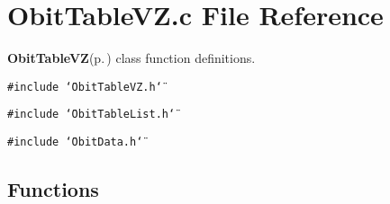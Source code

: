 \section{Obit\-Table\-VZ.c File Reference}
\label{ObitTableVZ_8c}
{\bf Obit\-Table\-VZ}{\rm (p.\,\pageref{structObitTableVZ})} class function definitions. 

{\tt \#include \char`\"{}Obit\-Table\-VZ.h\char`\"{}}\par
{\tt \#include \char`\"{}Obit\-Table\-List.h\char`\"{}}\par
{\tt \#include \char`\"{}Obit\-Data.h\char`\"{}}\par
\subsection*{Functions}
